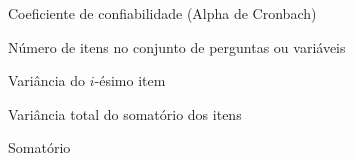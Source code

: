 \begin{simbolos}
  \item[$ \alpha $] Coeficiente de confiabilidade (Alpha de Cronbach)
  \item[$ N $] Número de itens no conjunto de perguntas ou variáveis
  \item[$ \sigma_{Y_i}^2 $] Variância do \( i \)-ésimo item
  \item[$ \sigma_X^2 $] Variância total do somatório dos itens
  \item[$ \sum $] Somatório
\end{simbolos}
